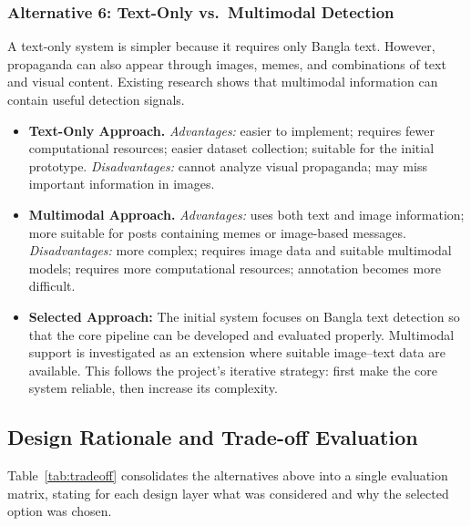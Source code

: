 \subsubsection{Alternative 6: Text-Only vs.\ Multimodal Detection}
A text-only system is simpler because it requires only Bangla text. However,
propaganda can also appear through images, memes, and combinations of text and
visual content. Existing research shows that multimodal information can contain
useful detection signals.
\begin{itemize}
  \item \textbf{Text-Only Approach.} \emph{Advantages:} easier to implement;
        requires fewer computational resources; easier dataset collection;
        suitable for the initial prototype. \emph{Disadvantages:} cannot analyze
        visual propaganda; may miss important information in images.
  \item \textbf{Multimodal Approach.} \emph{Advantages:} uses both text and image
        information; more suitable for posts containing memes or image-based
        messages. \emph{Disadvantages:} more complex; requires image data and
        suitable multimodal models; requires more computational resources;
        annotation becomes more difficult.
  \item \textbf{Selected Approach:} The initial system focuses on Bangla text
        detection so that the core pipeline can be developed and evaluated
        properly. Multimodal support is investigated as an extension where
        suitable image--text data are available. This follows the project's
        iterative strategy: first make the core system reliable, then increase its
        complexity.
\end{itemize}

\subsection{Design Rationale and Trade-off Evaluation}
Table~\ref{tab:tradeoff} consolidates the alternatives above into a single
evaluation matrix, stating for each design layer what was considered and why the
selected option was chosen.


